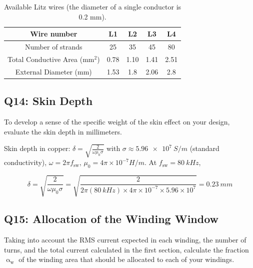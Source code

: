 \documentclass{PELsmallreport}
\begin{document}
\begin{table}[H]
\centering
\caption{Available Litz wires (the diameter of a single conductor is 0.2 mm).}
\label{tab:availablewiresLitz}
\begin{tabular}{ccccc}
	\toprule
	Wire number & L1 & L2 & L3 & L4 \\
	\midrule
    Number of strands  & 25 & 35 & 45 & 80 \\
	Total Conductive Area ($\mathrm{mm}^2$)  & 0.78 & 1.10 & 1.41 & 2.51 \\
    External Diameter ($\mathrm{mm}$) & 1.53 & 1.8 & 2.06 & 2.8 \\
	\bottomrule
\end{tabular}
\end{table}









\subsection{Q14: Skin Depth} 
To develop a sense of the specific weight of the skin effect on your design, evaluate the skin depth in millimeters.

\begin{framed}
	\vspace{2em}
    
    Skin depth in copper: $\delta = \sqrt{\frac{2}{\omega\mu_0\sigma}}$ with $\sigma\approx\SI{5.96e7}{S/m}$ (standard conductivity), $\omega=2\pi f_{\mathrm{sw}}$, $\mu_0={4\pi\times 10^{-7}}{H/m}$. At $f_{\mathrm{sw}}=\SI{80}{kHz}$,
    
\begin{equation}
  \delta = \sqrt{\frac{2}{\omega\mu_0\sigma}}
  = \sqrt{\frac{2}{2\pi(\SI{80}{kHz}) \times 4\pi\times 10^{-7} \times 5.96 \times 10^7}} = \SI{0.23}{mm}
\end{equation}
	\vspace{2em}
\end{framed}

 \hfill{}








\subsection{Q15: Allocation of the Winding Window} 
Taking into account the RMS current expected in each winding, the number of turns, and the total current calculated in the first section, calculate the fraction $\upalpha_\mathrm{w}$ of the winding area that should be allocated to each of your windings. 
\end{document}
